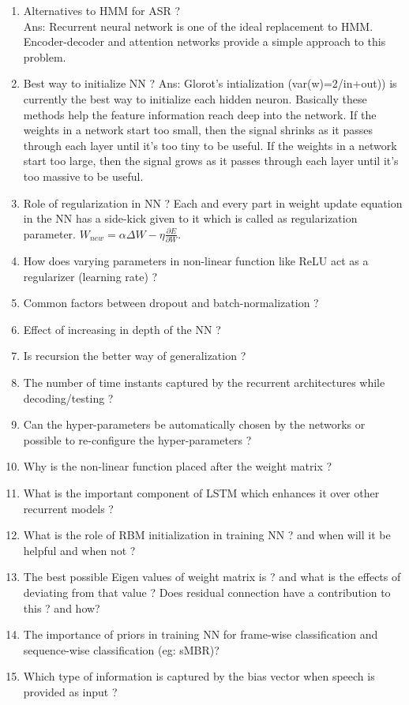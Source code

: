\documentclass[fleqn,10pt]{wlscirep}
\begin{document}
\begin{enumerate}
\item Alternatives to HMM for ASR ? \\
Ans: Recurrent neural network is one of the ideal replacement to HMM. Encoder-decoder and attention networks provide a simple approach to this problem.
\item Best way to initialize NN ?
Ans: Glorot's intialization (var(w)=2/in+out)) is currently the best way to initialize each hidden neuron. Basically these methods help the feature information reach deep into the network.
If the weights in a network start too small, then the signal shrinks as it passes through each layer until it’s too tiny to be useful. If the weights in a network start too large, then the signal grows as it passes through each layer until it’s too massive to be useful.
\item Role of regularization in NN ?
Each and every part in weight update equation in the NN has a side-kick given to it which is called as regularization parameter. $W_{new} = \alpha\Delta{W} - \eta\frac{\partial E}{\partial W}$. 
\item How does varying parameters in non-linear function like ReLU act as a regularizer (learning rate) ?
\item Common factors between dropout and batch-normalization ?
\item Effect of increasing in depth of the NN ?
\item Is recursion the better way of generalization ?
\item The number of time instants captured by the recurrent architectures while decoding/testing ?
\item Can the hyper-parameters be automatically chosen by the networks or possible to re-configure the hyper-parameters ?
\item Why is the non-linear function placed after the weight matrix ? 
\item What is the important component of LSTM which enhances it over other recurrent models ?
\item What is the role of RBM initialization in training NN ? and when will it be helpful and when not ?
\item The best possible Eigen values of weight matrix is ? and what is the effects of deviating from that value ? Does residual connection have a contribution to this ? and how?
\item The importance of priors in training NN for frame-wise classification and sequence-wise classification (eg: sMBR)?
\item Which type of information is captured by the bias vector when speech is provided as input ? 

\end{enumerate}
\end{document}

